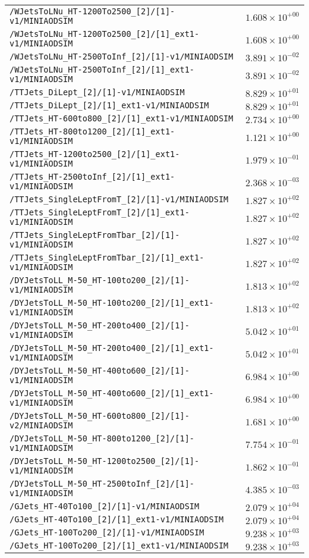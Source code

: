 \begin{center}
\begin{tabular}{ll}
\verb!/WJetsToLNu_HT-1200To2500_[2]/[1]-v1/MINIAODSIM! &$1.608\times 10^{+00}$\tabularnewline
\verb!/WJetsToLNu_HT-1200To2500_[2]/[1]_ext1-v1/MINIAODSIM! &$1.608\times 10^{+00}$\tabularnewline
\verb!/WJetsToLNu_HT-2500ToInf_[2]/[1]-v1/MINIAODSIM! &$3.891\times 10^{-02}$\tabularnewline
\verb!/WJetsToLNu_HT-2500ToInf_[2]/[1]_ext1-v1/MINIAODSIM! &$3.891\times 10^{-02}$\tabularnewline
\verb!/TTJets_DiLept_[2]/[1]-v1/MINIAODSIM! &$8.829\times 10^{+01}$\tabularnewline
\verb!/TTJets_DiLept_[2]/[1]_ext1-v1/MINIAODSIM! &$8.829\times 10^{+01}$\tabularnewline
\verb!/TTJets_HT-600to800_[2]/[1]_ext1-v1/MINIAODSIM! &$2.734\times 10^{+00}$\tabularnewline
\verb!/TTJets_HT-800to1200_[2]/[1]_ext1-v1/MINIAODSIM! &$1.121\times 10^{+00}$\tabularnewline
\verb!/TTJets_HT-1200to2500_[2]/[1]_ext1-v1/MINIAODSIM! &$1.979\times 10^{-01}$\tabularnewline
\verb!/TTJets_HT-2500toInf_[2]/[1]_ext1-v1/MINIAODSIM! &$2.368\times 10^{-03}$\tabularnewline
\verb!/TTJets_SingleLeptFromT_[2]/[1]-v1/MINIAODSIM! &$1.827\times 10^{+02}$\tabularnewline
\verb!/TTJets_SingleLeptFromT_[2]/[1]_ext1-v1/MINIAODSIM! &$1.827\times 10^{+02}$\tabularnewline
\verb!/TTJets_SingleLeptFromTbar_[2]/[1]-v1/MINIAODSIM! &$1.827\times 10^{+02}$\tabularnewline
\verb!/TTJets_SingleLeptFromTbar_[2]/[1]_ext1-v1/MINIAODSIM! &$1.827\times 10^{+02}$\tabularnewline
\verb!/DYJetsToLL_M-50_HT-100to200_[2]/[1]-v1/MINIAODSIM! &$1.813\times 10^{+02}$\tabularnewline
\verb!/DYJetsToLL_M-50_HT-100to200_[2]/[1]_ext1-v1/MINIAODSIM! &$1.813\times 10^{+02}$\tabularnewline
\verb!/DYJetsToLL_M-50_HT-200to400_[2]/[1]-v1/MINIAODSIM! &$5.042\times 10^{+01}$\tabularnewline
\verb!/DYJetsToLL_M-50_HT-200to400_[2]/[1]_ext1-v1/MINIAODSIM! &$5.042\times 10^{+01}$\tabularnewline
\verb!/DYJetsToLL_M-50_HT-400to600_[2]/[1]-v1/MINIAODSIM! &$6.984\times 10^{+00}$\tabularnewline
\verb!/DYJetsToLL_M-50_HT-400to600_[2]/[1]_ext1-v1/MINIAODSIM! &$6.984\times 10^{+00}$\tabularnewline
\verb!/DYJetsToLL_M-50_HT-600to800_[2]/[1]-v2/MINIAODSIM! &$1.681\times 10^{+00}$\tabularnewline
\verb!/DYJetsToLL_M-50_HT-800to1200_[2]/[1]-v1/MINIAODSIM! &$7.754\times 10^{-01}$\tabularnewline
\verb!/DYJetsToLL_M-50_HT-1200to2500_[2]/[1]-v1/MINIAODSIM! &$1.862\times 10^{-01}$\tabularnewline
\verb!/DYJetsToLL_M-50_HT-2500toInf_[2]/[1]-v1/MINIAODSIM! &$4.385\times 10^{-03}$\tabularnewline
\verb!/GJets_HT-40To100_[2]/[1]-v1/MINIAODSIM! &$2.079\times 10^{+04}$\tabularnewline
\verb!/GJets_HT-40To100_[2]/[1]_ext1-v1/MINIAODSIM! &$2.079\times 10^{+04}$\tabularnewline
\verb!/GJets_HT-100To200_[2]/[1]-v1/MINIAODSIM! &$9.238\times 10^{+03}$\tabularnewline
\verb!/GJets_HT-100To200_[2]/[1]_ext1-v1/MINIAODSIM! &$9.238\times 10^{+03}$\tabularnewline

\end{tabular}
\end{center}
